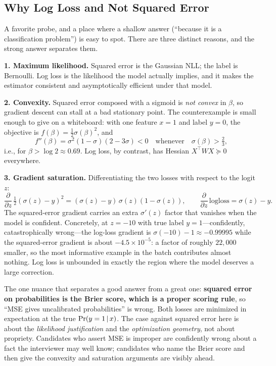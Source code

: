 \subsection{Why Log Loss and Not Squared Error}

A favorite probe, and a place where a shallow answer (``because it is a classification problem'') is easy to spot. There are three distinct reasons, and the strong answer separates them.

\textbf{1. Maximum likelihood.} Squared error is the Gaussian NLL; the label is Bernoulli. Log loss is the likelihood the model actually implies, and it makes the estimator consistent and asymptotically efficient under that model.

\textbf{2. Convexity.} Squared error composed with a sigmoid is \emph{not convex} in $\beta$, so gradient descent can stall at a bad stationary point. The counterexample is small enough to give on a whiteboard: with one feature $x=1$ and label $y=0$, the objective is $f(\beta) = \tfrac12\sigma(\beta)^2$, and
\begin{equation}
f''(\beta) = \sigma^2(1-\sigma)(2 - 3\sigma) < 0 \quad\text{whenever}\quad \sigma(\beta) > \tfrac{2}{3},
\end{equation}
i.e., for $\beta > \log 2 \approx 0.69$. Log loss, by contrast, has Hessian $X^{\top}WX \succeq 0$ everywhere.

\textbf{3. Gradient saturation.} Differentiating the two losses with respect to the logit $z$:
\begin{equation}
\frac{\partial}{\partial z}\,\tfrac12(\sigma(z)-y)^2 = (\sigma(z)-y)\,\sigma(z)(1-\sigma(z)),
\qquad
\frac{\partial}{\partial z}\,\text{logloss} = \sigma(z)-y .
\end{equation}
The squared-error gradient carries an extra $\sigma'(z)$ factor that vanishes when the model is confident. Concretely, at $z = -10$ with true label $y=1$---confidently, catastrophically wrong---the log-loss gradient is $\sigma(-10)-1 \approx -0.99995$ while the squared-error gradient is about $-4.5\times10^{-5}$: a factor of roughly $22{,}000$ smaller, so the most informative example in the batch contributes almost nothing. Log loss is unbounded in exactly the region where the model deserves a large correction.

\begin{warningbox}
The one nuance that separates a good answer from a great one: \textbf{squared error on probabilities is the Brier score, which is a proper scoring rule}, so ``MSE gives uncalibrated probabilities'' is wrong. Both losses are minimized in expectation at the true $\Pr(y=1\,|\, x)$. The case against squared error here is about the \emph{likelihood justification} and the \emph{optimization geometry}, not about propriety. Candidates who assert MSE is improper are confidently wrong about a fact the interviewer may well know; candidates who name the Brier score and then give the convexity and saturation arguments are visibly ahead.
\end{warningbox}

